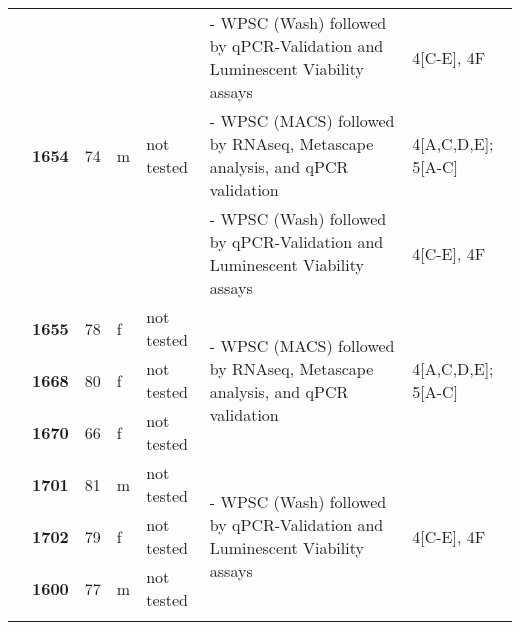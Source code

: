 {\begin{longtable}{|>{\bfseries}p{1.5cm}|>{\bfseries}p{1.2cm}|p{1cm}|p{1cm}|p{2.3cm}|p{6cm}|p{1.7cm}|}
        \hhline{~~~~~--}
                          &       &    &   &            & - WPSC (Wash) followed by qPCR-Validation and Luminescent Viability assays                               & 4[C-E], 4F                              \\
        \hhline{~------}
                          & 1654  & 74 & m & not tested & - WPSC (MACS) followed by RNAseq, Metascape analysis, and qPCR validation                                & 4[A,C,D,E]; 5[A-C]                      \\
        \hhline{~~~~~--}
                          &       &    &   &            & - WPSC (Wash) followed by qPCR-Validation and Luminescent Viability assays                               & 4[C-E], 4F                              \\
        \hhline{~------}
                          & 1655  & 78 & f & not tested & \multirow{3}{6cm}{- WPSC (MACS) followed by RNAseq, Metascape analysis, and qPCR validation}             & \multirow{3}{1.7cm}{4[A,C,D,E]; 5[A-C]} \\
        \hhline{~----~~}
                          & 1668  & 80 & f & not tested &                                                                                                          &                                         \\
        \hhline{~----~~}
                          & 1670  & 66 & f & not tested &                                                                                                          &                                         \\
        \hhline{~------}
                          & 1701  & 81 & m & not tested & \multirow{3}{6cm}{- WPSC (Wash) followed by qPCR-Validation and Luminescent Viability assays}            & \multirow{3}{1.7cm}{4[C-E], 4F}         \\
        \hhline{~----~~}
                          & 1702  & 79 & f & not tested &                                                                                                          &                                         \\
        \hhline{~----~~}
                          & 1600  & 77 & m & not tested &                                                                                                          &                                         \\
        \hhline{~------}


\end{longtable}}
